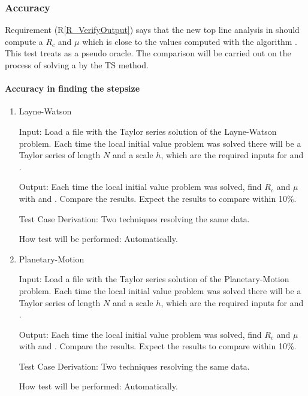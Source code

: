 \documentclass[12pt, titlepage]{article}
\newcommand{\rref}[1]{(R\ref{#1})}
\begin{document}
\subsubsection{Accuracy}

Requirement \rref{R_VerifyOutput} says that the new top line
analysis in  should compute a $R_c$ and $\mu$ which is
close to the values computed with the \cite{chang1982} algorithm \rdcon.
This test treats \rdcon as a pseudo oracle.
The comparison will be carried out on the process of solving a \dae \ivp by the TS method.

\paragraph{Accuracy in finding the stepsize}

\begin{enumerate}

\item{Layne-Watson \citep{watson1979}\\}

					
					
Input: Load a file with the Taylor series solution of the Layne-Watson problem. Each time the
    local initial value problem was solved there will be a Taylor series of length $N$ and a scale $h$,
    which are the required inputs for  and \rdcon.
					
Output: Each time the local initial value problem was solved, find $R_c$ and $\mu$ with
     and \rdcon. Compare the results. Expect the results to compare within 10\%.

Test Case Derivation: Two techniques resolving the same data.
					
How test will be performed: Automatically.
					
\item{Planetary-Motion \citep{enright1987examples}\\}

					
					
Input: Load a file with the Taylor series solution of the Planetary-Motion problem. Each time the
    local initial value problem was solved there will be a Taylor series of length $N$ and a scale $h$,
    which are the required inputs for  and \rdcon.
					
Output: Each time the local initial value problem was solved, find $R_c$ and $\mu$ with
     and \rdcon. Compare the results. Expect the results to compare within 10\%.

Test Case Derivation: Two techniques resolving the same data.
					
How test will be performed: Automatically.

\end{enumerate}
\end{document}
